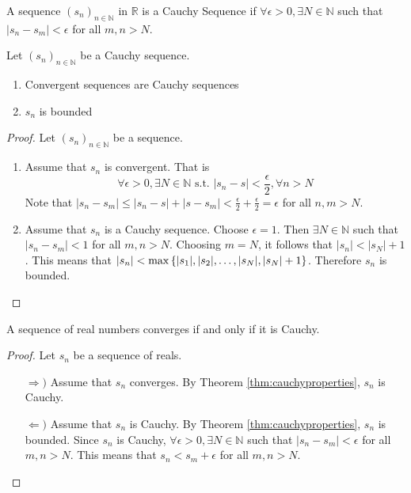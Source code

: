 \documentclass[../notes.tex]{subfiles}
\begin{document}
\begin{definition}
    A sequence $(s_n)_{n\in \mathbb{N}}$ in $\mathbb{R}$ is a Cauchy Sequence if $\forall \epsilon > 0, \exists N \in \mathbb{N}$ such that $|s_n - s_m| < \epsilon$ for all $m,n > N$.
\end{definition}
\begin{theorem}
    \label{thm:cauchyproperties}
    Let $(s_n)_{n\in \mathbb{N}}$ be a Cauchy sequence.
    \begin{enumerate}
        \item Convergent sequences are Cauchy sequences
        \item $s_n$ is bounded
    \end{enumerate}
\end{theorem}

\begin{proof}
    Let $(s_n)_{n\in \mathbb{N}}$ be a sequence.
    \begin{enumerate}
        \item %
        Assume that $s_n$ is convergent. That is
        \[
            \forall \epsilon > 0, \exists N \in \mathbb{N} \text{ s.t. } |s_n - s| < \frac{\epsilon}{2}, \forall n > N
        \]
        Note that $|s_n - s_m| \leq |s_n - s| + |s - s_m| < \frac{\epsilon}{2} + \frac{\epsilon}{2} = \epsilon$ for all $n, m > N$.
        \item %
        Assume that $s_n$ is a Cauchy sequence. Choose $\epsilon = 1$. Then $\exists N \in \mathbb{N}$ such that $|s_n - s_m| < 1$ for all $m,n > N$. Choosing $m = N$, it follows that $|s_n| < |s_N| + 1$. This means that $|s_n| < \max\qty{|s_1|, |s_2|, \ldots, |s_N|, |s_N| + 1}$. Therefore $s_n$ is bounded.
    \end{enumerate}
\end{proof}

\begin{theorem}
    A sequence of real numbers converges if and only if it is Cauchy.
\end{theorem}
\begin{proof}
    Let $s_n$ be a sequence of reals.
    \begin{enumerate}
        \item[$\Rightarrow)$] %
        Assume that $s_n$ converges. By Theorem \ref{thm:cauchyproperties}, $s_n$ is Cauchy.
        \item[$\Leftarrow)$] %
        Assume that $s_n$ is Cauchy. By Theorem \ref{thm:cauchyproperties}, $s_n$ is bounded. Since $s_n$ is Cauchy, $\forall \epsilon > 0, \exists N \in \mathbb{N}$ such that $|s_n - s_m| < \epsilon$ for all $m,n > N$. This means that $s_n < s_m + \epsilon$ for all $m,n > N$.
    \end{enumerate}
\end{proof}
\end{document}
